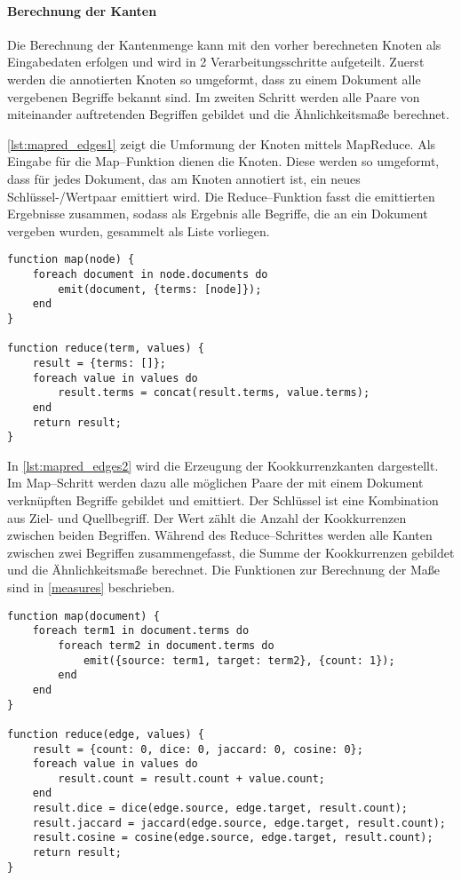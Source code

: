 \paragraph{Berechnung der Kanten}

Die Berechnung der Kantenmenge kann mit den vorher berechneten Knoten als Eingabedaten erfolgen und wird in 2 Verarbeitungsschritte aufgeteilt. Zuerst werden die annotierten Knoten so umgeformt, dass zu einem Dokument alle vergebenen Begriffe bekannt sind. Im zweiten Schritt werden alle Paare von miteinander auftretenden Begriffen gebildet und die Ähnlichkeitsmaße berechnet.

\cref{lst:mapred_edges1} zeigt die Umformung der Knoten mittels MapReduce. Als Eingabe für die Map--Funktion dienen die Knoten. Diese werden so umgeformt, dass für jedes Dokument, das am Knoten annotiert ist, ein neues Schlüssel-/Wertpaar emittiert wird. Die Reduce--Funktion fasst die emittierten Ergebnisse zusammen, sodass als Ergebnis alle Begriffe, die an ein Dokument vergeben wurden, gesammelt als Liste vorliegen.

\begin{lstlisting}[language=pseudo, label={lst:mapred_edges1}, caption={Umformung der Knoten mit MapReduce}, float]
function map(node) {
    foreach document in node.documents do
        emit(document, {terms: [node]});
    end
}

function reduce(term, values) {
    result = {terms: []};
    foreach value in values do
        result.terms = concat(result.terms, value.terms);
    end
    return result;
}
\end{lstlisting}

In \cref{lst:mapred_edges2} wird die Erzeugung der Kookkurrenzkanten dargestellt. Im Map--Schritt werden dazu alle möglichen Paare der mit einem Dokument verknüpften Begriffe gebildet und emittiert. Der Schlüssel ist eine Kombination aus Ziel- und Quellbegriff. Der Wert zählt die Anzahl der Kookkurrenzen zwischen beiden Begriffen. Während des Reduce--Schrittes werden alle Kanten zwischen zwei Begriffen zusammengefasst, die Summe der Kookkurrenzen gebildet und die Ähnlichkeitsmaße berechnet. Die Funktionen zur Berechnung der Maße sind in \cref{measures} beschrieben.

\begin{lstlisting}[language=pseudo, label={lst:mapred_edges2}, caption={Kantenerzeugung mit MapReduce}, float]
function map(document) {
    foreach term1 in document.terms do
        foreach term2 in document.terms do
            emit({source: term1, target: term2}, {count: 1});
        end
    end
}

function reduce(edge, values) {
    result = {count: 0, dice: 0, jaccard: 0, cosine: 0};
    foreach value in values do
        result.count = result.count + value.count;
    end
    result.dice = dice(edge.source, edge.target, result.count);
    result.jaccard = jaccard(edge.source, edge.target, result.count);
    result.cosine = cosine(edge.source, edge.target, result.count);
    return result;
}
\end{lstlisting}


